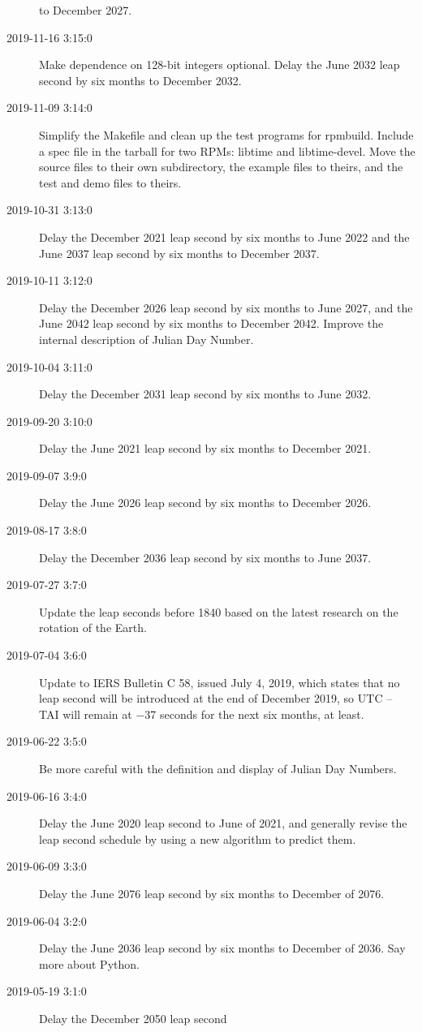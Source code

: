 \documentclass[letterpaper,twoside]{article}
\begin{document}
\begin{description}
  to December 2027.
\item[2019-11-16 3:15:0]Make dependence on 128-bit integers optional.
  Delay the June 2032 leap second by six months to December 2032.
\item[2019-11-09 3:14:0]Simplify the Makefile and clean up the
  test programs for rpmbuild.  Include a spec file in the tarball
  for two RPMs: libtime and libtime-devel.  Move the source
  files to their own subdirectory, the example files to theirs,
  and the test and demo files to theirs.
\item[2019-10-31 3:13:0]Delay the December 2021 leap second by
  six months to June 2022 and the June 2037 leap second by six
  months to December 2037.
\item[2019-10-11 3:12:0]Delay the December 2026 leap second by
  six months to June 2027, and the June 2042 leap second by six
  months to December 2042.  Improve the internal description of
  Julian Day Number.
\item[2019-10-04 3:11:0]Delay the December 2031 leap second by
  six months to June 2032.
\item[2019-09-20 3:10:0]Delay the June 2021 leap second by six
  months to December 2021.
\item[2019-09-07 3:9:0]Delay the June 2026 leap second by six months
  to December 2026.
\item[2019-08-17 3:8:0]Delay the December 2036 leap second by six
  months to June 2037.
\item[2019-07-27 3:7:0]Update the leap seconds before 1840 based
  on the latest research on the rotation of the Earth.
\item[2019-07-04 3:6:0]Update to IERS Bulletin C 58, issued July
  4, 2019, which states that no leap second will be introduced
  at the end of December 2019, so UTC -- TAI will remain at
  \num{-37} seconds for the next six months, at least.  
\item[2019-06-22 3:5:0] Be more careful with the definition
  and display of Julian Day Numbers.
\item[2019-06-16 3:4:0] Delay the June 2020 leap second to
  June of 2021, and generally revise the leap second schedule
  by using a new algorithm to predict them.
\item[2019-06-09 3:3:0] Delay the June 2076 leap second by
  six months to December of 2076.
\item[2019-06-04 3:2:0] Delay the June 2036 leap second by
  six months to December of 2036.  Say more about Python.
\item[2019-05-19 3:1:0] Delay the December 2050 leap second

\end{description}
\end{document}
